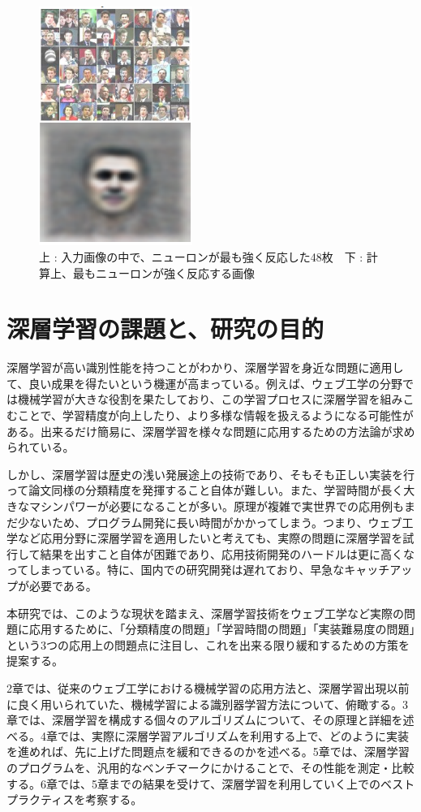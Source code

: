 \begin{figure}[tbp]
 \begin{center}
  \includegraphics[width=50mm]{img/c1/google_face}
 \end{center}
 \caption{上 : 入力画像の中で、ニューロンが最も強く反応した48枚　下 : 計算上、最もニューロンが強く反応する画像}
 \label{c1_facedetection}
\end{figure}


\section{深層学習の課題と、研究の目的}
深層学習が高い識別性能を持つことがわかり、深層学習を身近な問題に適用して、良い成果を得たいという機運が高まっている。例えば、ウェブ工学の分野では機械学習が大きな役割を果たしており、この学習プロセスに深層学習を組みこむことで、学習精度が向上したり、より多様な情報を扱えるようになる可能性がある。出来るだけ簡易に、深層学習を様々な問題に応用するための方法論が求められている。\par
しかし、深層学習は歴史の浅い発展途上の技術であり、そもそも正しい実装を行って論文同様の分類精度を発揮すること自体が難しい。また、学習時間が長く大きなマシンパワーが必要になることが多い。原理が複雑で実世界での応用例もまだ少ないため、プログラム開発に長い時間がかかってしまう。つまり、ウェブ工学など応用分野に深層学習を適用したいと考えても、実際の問題に深層学習を試行して結果を出すこと自体が困難であり、応用技術開発のハードルは更に高くなってしまっている。特に、国内での研究開発は遅れており、早急なキャッチアップが必要である。\par
本研究では、このような現状を踏まえ、深層学習技術をウェブ工学など実際の問題に応用するために、「分類精度の問題」「学習時間の問題」「実装難易度の問題」という3つの応用上の問題点に注目し、これを出来る限り緩和するための方策を提案する。\par
2章では、従来のウェブ工学における機械学習の応用方法と、深層学習出現以前に良く用いられていた、機械学習による識別器学習方法について、俯瞰する。3章では、深層学習を構成する個々のアルゴリズムについて、その原理と詳細を述べる。4章では、実際に深層学習アルゴリズムを利用する上で、どのように実装を進めれば、先に上げた問題点を緩和できるのかを述べる。5章では、深層学習のプログラムを、汎用的なベンチマークにかけることで、その性能を測定・比較する。6章では、5章までの結果を受けて、深層学習を利用していく上でのベストプラクティスを考察する。
